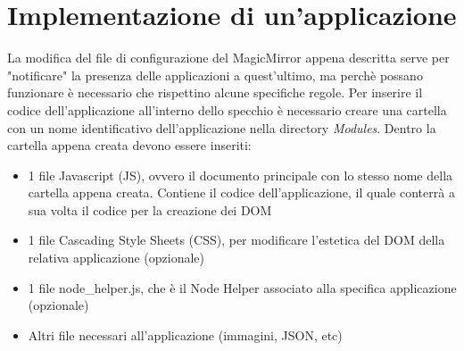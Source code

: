 \section{Implementazione di un'applicazione}\label{cap:app}
La modifica del file di configurazione del MagicMirror appena descritta serve per "notificare" la presenza delle applicazioni a quest'ultimo,
ma perch\`e possano funzionare \`e necessario che rispettino alcune specifiche regole.
Per inserire il codice dell'applicazione all'interno dello specchio \`e necessario creare una cartella con un nome identificativo dell'applicazione
nella directory \textit{Modules}.
Dentro la cartella appena creata devono essere inseriti:
\begin{itemize}
\item 1 file Javascript (JS), ovvero il documento principale con lo stesso nome della cartella appena creata. Contiene il codice dell'applicazione, il quale
conterr\`a a sua volta il codice per la creazione dei DOM
\item 1 file Cascading Style Sheets (CSS), per modificare l'estetica del DOM della relativa applicazione (opzionale)
\item 1 file node\_helper.js, che \`e il Node Helper associato alla specifica applicazione (opzionale)
\item Altri file necessari all'applicazione (immagini, JSON, etc)\\[1\baselineskip]
\end{itemize}



